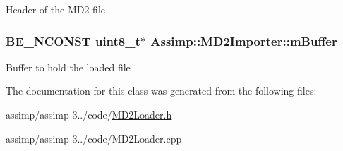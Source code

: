 Header of the M\+D2 file \hypertarget{class_assimp_1_1_m_d2_importer_a1bc78b40df179c9e8ba3eef558efc8ac}{
\subsubsection[{m\+Buffer}]{\setlength{\rightskip}{0pt plus 5cm}B\+E\+\_\+\+N\+C\+O\+N\+S\+T uint8\+\_\+t$\ast$ Assimp\+::\+M\+D2\+Importer\+::m\+Buffer\hspace{0.3cm}{\ttfamily [protected]}}}\label{class_assimp_1_1_m_d2_importer_a1bc78b40df179c9e8ba3eef558efc8ac}
Buffer to hold the loaded file 

The documentation for this class was generated from the following files\+:\begin{DoxyCompactItemize}
\item 
assimp/assimp-\/3../code/\hyperlink{_m_d2_loader_8h}{M\+D2\+Loader.\+h}\item 
assimp/assimp-\/3../code/M\+D2\+Loader.\+cpp\end{DoxyCompactItemize}
